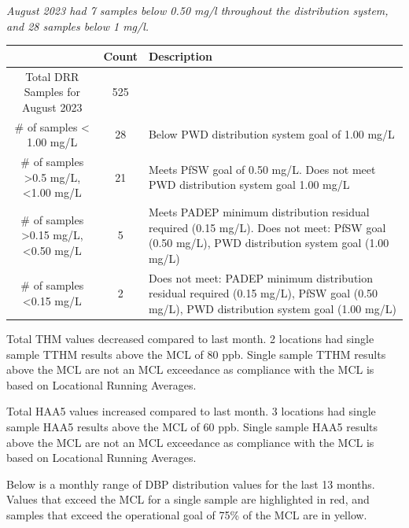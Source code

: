 \documentclass[
]{article}
\begin{document}
\emph{August 2023 had 7 samples below 0.50 mg/l throughout the
distribution system, and 28 samples below 1 mg/l.}

\begin{table}
\centering
\begin{tabular}[t]{c|c|>{\centering\arraybackslash}p{20em}}
\hline
 & Count & Description\\
\hline
Total DRR Samples for August 2023 & 525 & \\
\hline
# of samples < 1.00 mg/L & 28 & Below PWD distribution system goal of 1.00 mg/L\\
\hline
# of samples >0.5 mg/L, <1.00 mg/L & 21 & Meets PfSW goal of 0.50 mg/L. Does not meet PWD distribution system goal 1.00 mg/L\\
\hline
# of samples >0.15 mg/L, <0.50 mg/L & 5 & Meets PADEP minimum distribution residual required (0.15 mg/L). Does not meet: PfSW goal (0.50 mg/L), PWD distribution system goal (1.00 mg/L)\\
\hline
# of samples <0.15 mg/L & 2 & Does not meet: PADEP minimum distribution residual required (0.15 mg/L), PfSW goal (0.50 mg/L), PWD distribution system goal (1.00 mg/L)\\
\hline
\end{tabular}
\end{table}

Total THM values decreased compared to last month. 2 locations had
single sample TTHM results above the MCL of 80 ppb. Single sample TTHM
results above the MCL are not an MCL exceedance as compliance with the
MCL is based on Locational Running Averages.

Total HAA5 values increased compared to last month. 3 locations had
single sample HAA5 results above the MCL of 60 ppb. Single sample HAA5
results above the MCL are not an MCL exceedance as compliance with the
MCL is based on Locational Running Averages.

Below is a monthly range of DBP distribution values for the last 13
months. Values that exceed the MCL for a single sample are highlighted
in red, and samples that exceed the operational goal of 75\% of the MCL
are in yellow.
\end{document}
